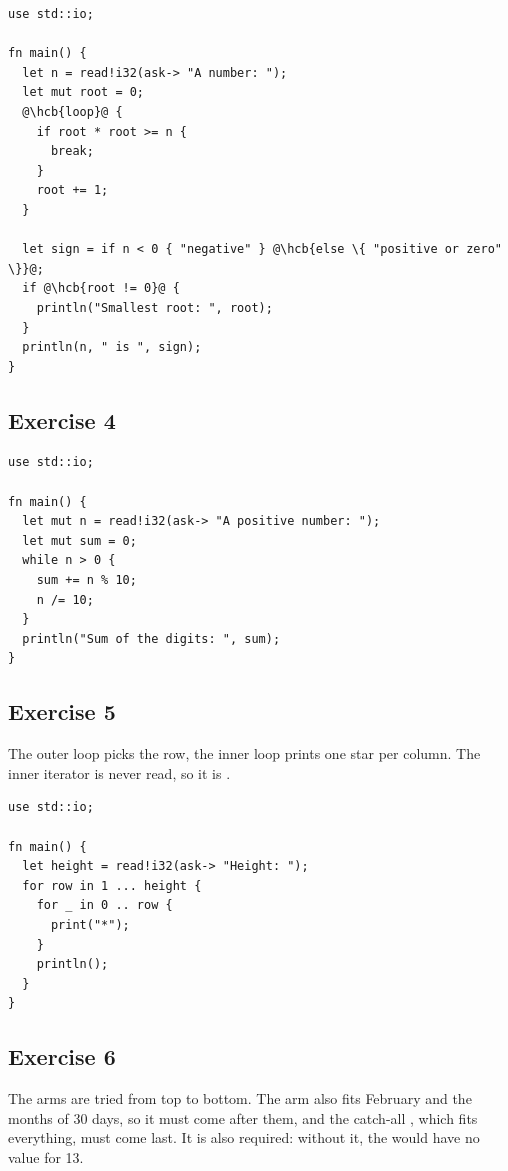 \begin{lstlisting}[style=coloredverbatim, escapechar=@, caption=Solution for exercise 3]
use std::io;

fn main() {
  let n = read!i32(ask-> "A number: ");
  let mut root = 0;
  @\hcb{loop}@ {
    if root * root >= n {
      break;
    }
    root += 1;
  }

  let sign = if n < 0 { "negative" } @\hcb{else \{ "positive or zero" \}}@;
  if @\hcb{root != 0}@ {
    println("Smallest root: ", root);
  }
  println(n, " is ", sign);
}
\end{lstlisting}

\subsection*{Exercise 4}

\begin{lstlisting}[style=coloredverbatim, caption=Solution for exercise 4]
use std::io;

fn main() {
  let mut n = read!i32(ask-> "A positive number: ");
  let mut sum = 0;
  while n > 0 {
    sum += n % 10;
    n /= 10;
  }
  println("Sum of the digits: ", sum);
}
\end{lstlisting}

\subsection*{Exercise 5}

The outer loop picks the row, the inner loop prints one star per column. The
inner iterator is never read, so it is \token{\_}.

\begin{lstlisting}[style=coloredverbatim, caption=Solution for exercise 5]
use std::io;

fn main() {
  let height = read!i32(ask-> "Height: ");
  for row in 1 ... height {
    for _ in 0 .. row {
      print("*");
    }
    println();
  }
}
\end{lstlisting}

\subsection*{Exercise 6}

The arms are tried from top to bottom. The arm  also fits
February and the months of 30 days, so it must come after them, and the
catch-all \token{\_}, which fits everything, must come last. It is also required:
without it, the  would have no value for 13.

